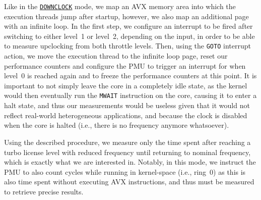 Like in the \hyperref[sec:analysis:design:measurementmodes:downclock]{\texttt{DOWNCLOCK}} mode, we map an \gls{AVX} memory area into which the execution threads jump after startup, however, we also map an additional page with an infinite loop. In the first step, we configure an interrupt to be fired after switching to either level~1 or level~2, depending on the input, in order to be able to measure upclocking from both throttle levels. Then, using the \texttt{GOTO} interrupt action, we move the execution thread to the infinite loop page, reset our performance counters and configure the \gls{PMU} to trigger an interrupt for when level~0 is reached again and to freeze the performance counters at this point. It is important to not simply leave the core in a completely idle state, as the kernel would then eventually run the \texttt{MWAIT} \cite{intelsdminstructionreference} instruction on the core, causing it to enter a halt state, and thus our measurements would be useless given that it would not reflect real-world heterogeneous applications, and because the clock is disabled when the core is halted (i.e., there is no frequency anymore whatsoever).

Using the described procedure, we measure only the time spent after reaching a turbo license level with reduced frequency until returning to nominal frequency, which is exactly what we are interested in. Notably, in this mode, we instruct the \gls{PMU} to also count cycles while running in kernel-space (i.e., ring~$0$) as this is also time spent without executing \gls{AVX} instructions, and thus must be measured to retrieve precise results.


